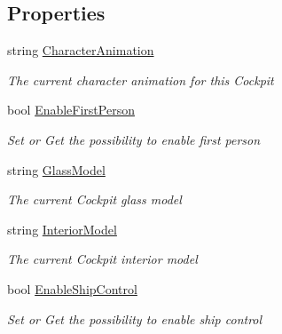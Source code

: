 \subsection*{Properties}
\begin{DoxyCompactItemize}
\item 
string \hyperlink{class_s_e_mod_a_p_i_1_1_a_p_i_1_1_definitions_1_1_cube_blocks_1_1_cockpit_definition_a1448101762b53235911f9463e56240cd}{Character\+Animation}
\begin{DoxyCompactList}\small\item\em The current character animation for this Cockpit \end{DoxyCompactList}\item 
bool \hyperlink{class_s_e_mod_a_p_i_1_1_a_p_i_1_1_definitions_1_1_cube_blocks_1_1_cockpit_definition_a4b028e50f21747a30af59b253d16caf4}{Enable\+First\+Person}
\begin{DoxyCompactList}\small\item\em Set or Get the possibility to enable first person \end{DoxyCompactList}\item 
string \hyperlink{class_s_e_mod_a_p_i_1_1_a_p_i_1_1_definitions_1_1_cube_blocks_1_1_cockpit_definition_a164033a23db86a6c6c36b79c7cd0b650}{Glass\+Model}
\begin{DoxyCompactList}\small\item\em The current Cockpit glass model \end{DoxyCompactList}\item 
string \hyperlink{class_s_e_mod_a_p_i_1_1_a_p_i_1_1_definitions_1_1_cube_blocks_1_1_cockpit_definition_a5d55b516dd21fcb0e68d7e568eb4114a}{Interior\+Model}
\begin{DoxyCompactList}\small\item\em The current Cockpit interior model \end{DoxyCompactList}\item 
bool \hyperlink{class_s_e_mod_a_p_i_1_1_a_p_i_1_1_definitions_1_1_cube_blocks_1_1_cockpit_definition_af1bb3c1c63599947d14bdef995d57787}{Enable\+Ship\+Control}
\begin{DoxyCompactList}\small\item\em Set or Get the possibility to enable ship control \end{DoxyCompactList}\end{DoxyCompactItemize}
